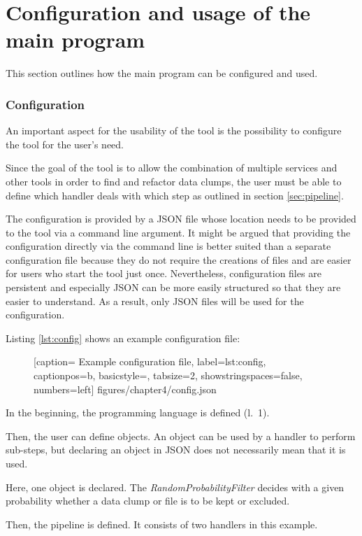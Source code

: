 \section{Configuration and usage of the main program}\label{sec:config}
This section outlines how the main program can be configured and used.

\subsubsection{Configuration}
An important aspect for the usability of the tool is the possibility to configure the tool for the user's need. 

Since the goal of the tool is to allow the combination of multiple services and other tools in order to find and refactor data clumps, the user must be able to define which handler deals with which step  as outlined in section \ref{sec:pipeline}.

The configuration is provided by a \ac{JSON} file whose location needs to be provided to the tool via a command line argument. It might be argued that providing the configuration directly via the command line is better suited than a separate configuration file because they do not require the creations of files and are easier for users who start the tool just once. Nevertheless, configuration files are persistent and especially \ac{JSON} can be more easily structured so that they are easier to understand. As a result, only \ac{JSON} files will be used  for the configuration. 


Listing \ref{lst:config} shows an example configuration file:
  \begin{figure} [htbp!]
			
			[caption={ Example configuration file},
			label={lst:config},
			captionpos=b, basicstyle=\footnotesize, tabsize=2, showstringspaces=false,  numbers=left]
			{figures/chapter4/config.json}
		\end{figure}


In the beginning, the programming language is defined (l.~1). 

Then, the user can define objects. An object can be used by a handler to perform sub-steps, but declaring an object in \ac{JSON} does not necessarily mean that it is used. 

Here, one object is declared. The \textit{RandomProbabilityFilter} decides with a given probability whether a data clump or file is to be kept or excluded. 


Then, the pipeline is defined. It consists of two handlers in this example.

